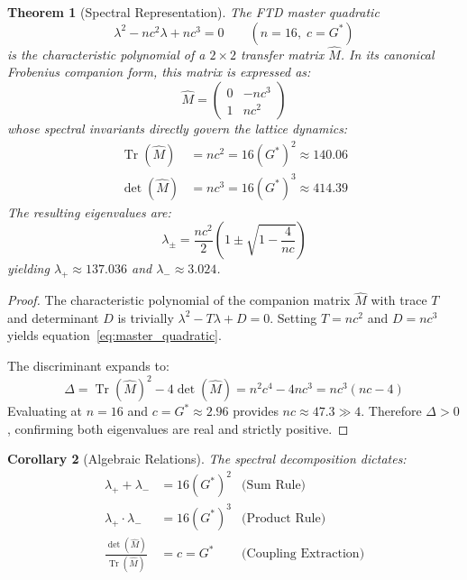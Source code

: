 \documentclass[12pt]{article}
\DeclareMathOperator{\Tr}{Tr}
\newtheorem{theorem}{Theorem}[section]
\newtheorem{corollary}[theorem]{Corollary}
\theoremstyle{definition}
\theoremstyle{remark}
\begin{document}
\begin{theorem}[Spectral Representation]
\label{thm:spectral}
The FTD master quadratic
\begin{equation}
\label{eq:master_quadratic}
    \lambda^2 - nc^2\lambda + nc^3 = 0 \qquad (n = 16,\; c = G^{*})
\end{equation}
is the characteristic polynomial of a $2 \times 2$ transfer matrix $\hat{M}$. In its canonical Frobenius companion form, this matrix is expressed as:
\begin{equation}
\label{eq:companion_matrix}
    \hat{M} = \begin{pmatrix} 0 & -nc^3 \\ 1 & nc^2 \end{pmatrix}
\end{equation}
whose spectral invariants directly govern the lattice dynamics:
\begin{align}
    \Tr(\hat{M}) &= nc^2 = 16(G^{*})^2 \approx 140.06 \label{eq:trace}\\
    \det(\hat{M}) &= nc^3 = 16(G^{*})^3 \approx 414.39 \label{eq:det}
\end{align}
The resulting eigenvalues are:
\begin{equation}
\label{eq:eigenvalues}
    \lambda_\pm = \frac{nc^2}{2}\left(1 \pm \sqrt{1 - \frac{4}{nc}}\right)
\end{equation}
yielding $\lambda_+ \approx 137.036$ and $\lambda_- \approx 3.024$.
\end{theorem}

\begin{proof}
The characteristic polynomial of the companion matrix $\hat{M}$ with trace $T$ and determinant $D$ is trivially $\lambda^2 - T\lambda + D = 0$. Setting $T = nc^2$ and $D = nc^3$ yields equation~\eqref{eq:master_quadratic}.

The discriminant expands to:
\begin{equation}
    \Delta = \Tr(\hat{M})^2 - 4\det(\hat{M}) = n^2c^4 - 4nc^3 = nc^3(nc - 4)
\end{equation}
Evaluating at $n = 16$ and $c = G^{*} \approx 2.96$ provides $nc \approx 47.3 \gg 4$. Therefore $\Delta > 0$, confirming both eigenvalues are real and strictly positive.
\end{proof}

\begin{corollary}[Algebraic Relations]
\label{cor:vieta}
The spectral decomposition dictates:
\begin{align}
    \lambda_+ + \lambda_- &= 16(G^{*})^2 & \text{(Sum Rule)} \label{eq:sum_rule}\\
    \lambda_+ \cdot \lambda_- &= 16(G^{*})^3 & \text{(Product Rule)} \label{eq:product_rule}\\
    \frac{\det(\hat{M})}{\Tr(\hat{M})} &= c = G^{*} & \text{(Coupling Extraction)} \label{eq:coupling}
\end{align}
\end{corollary}
\end{document}
